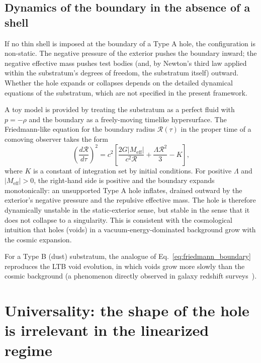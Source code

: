 \documentclass[%
  reprint,
  superscriptaddress,
  showpacs,
  showkeys,
  amsmath,amssymb,
  pra,
  longbibliography,
  floatfix,
  x11names
]{revtex4-2}
\begin{document}
\subsection{Dynamics of the boundary in the absence of a shell}
\label{sec:dynamics}

If no thin shell is imposed at the boundary of a Type A hole, the configuration is non-static. The negative pressure of the exterior pushes the boundary inward; the negative effective mass pushes test bodies (and, by Newton's third law applied within the substratum's degrees of freedom, the substratum itself) outward. Whether the hole expands or collapses depends on the detailed dynamical equations of the substratum, which are not specified in the present framework.

A toy model is provided by treating the substratum as a perfect fluid with $p = -\rho$ and the boundary as a freely-moving timelike hypersurface. The Friedmann-like equation for the boundary radius $\mathcal{R}(\tau)$ in the proper time of a comoving observer takes the form
\begin{equation}
\left(\frac{d\mathcal{R}}{d\tau}\right)^2 = c^2\left[\frac{2 G |M_{\mathrm{eff}}|}{c^2 \mathcal{R}} + \frac{\Lambda \mathcal{R}^2}{3} - K\right],
\label{eq:friedmann_boundary}
\end{equation}
where $K$ is a constant of integration set by initial conditions. For positive $\Lambda$ and $|M_{\mathrm{eff}}| > 0$, the right-hand side is positive and the boundary expands monotonically: an unsupported Type A hole inflates, drained outward by the exterior's negative pressure and the repulsive effective mass. The hole is therefore dynamically unstable in the static-exterior sense, but stable in the sense that it does not collapse to a singularity. This is consistent with the cosmological intuition that holes (voids) in a vacuum-energy-dominated background grow with the cosmic expansion.

For a Type B (dust) substratum, the analogue of Eq.~\eqref{eq:friedmann_boundary} reproduces the LTB void evolution, in which voids grow more slowly than the cosmic background (a phenomenon directly observed in galaxy redshift surveys~\cite{hamaus-2014,nadathur-2019}).

\section{Universality: the shape of the hole is irrelevant in the linearized regime}
\label{sec:universality}
\end{document}
